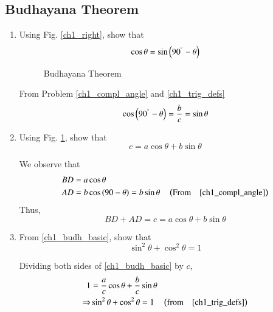 \subsection{Budhayana Theorem}
\renewcommand{\theequation}{\theenumi}
\begin{enumerate}[label=\arabic*.,ref=\thesubsection.\theenumi]



\item 	Using Fig. \ref{ch1_right}, show that
	\begin{equation}
	\cos \theta = \sin \left(90^{\degree} - \theta\right)
	\end{equation}


\begin{figure}[!ht]
	\begin{center}
		
		\resizebox{\columnwidth}{!}{}
	\end{center}
	\caption{Budhayana Theorem}
	\label{ch1_budh_triangle}	
\end{figure}


\proof From Problem \ref{ch1_compl_angle} and  \eqref{ch1_trig_defs}
%
\begin{equation}
	\cos \left(90^{\degree}-\theta\right) = \frac{b}{c} = \sin \theta
\end{equation}
%
\item
Using Fig. \ref{ch1_budh_triangle}, show that 
%
\begin{equation}
\label{ch1_budh_basic}
c = a \cos \theta + b \sin \theta
\end{equation}
%

\proof We observe that
%
\begin{align}
BD &= a \cos \theta \\
AD &= b \cos\left(90-\theta\right) = b \sin \theta \quad \left(\text{From} \quad \eqref{ch1_compl_angle}\right)
\end{align}
%
Thus,
\begin{equation}
BD + AD = c = a \cos \theta + b \sin \theta
\end{equation}
\item
From \eqref{ch1_budh_basic}, show that
%
\begin{equation}
\sin ^2 \theta + \cos ^2 \theta = 1
\end{equation}


%
\proof Dividing both sides of \eqref{ch1_budh_basic} by $c$, 
\begin{align}
1 &= \frac{a}{c}\cos\theta + \frac{b}{c}\sin\theta\\
\Rightarrow &\sin ^2 \theta + \cos ^2 \theta = 1 \quad \left(\text{from} \quad \eqref{ch1_trig_defs}\right)
\end{align}


\end{enumerate}
